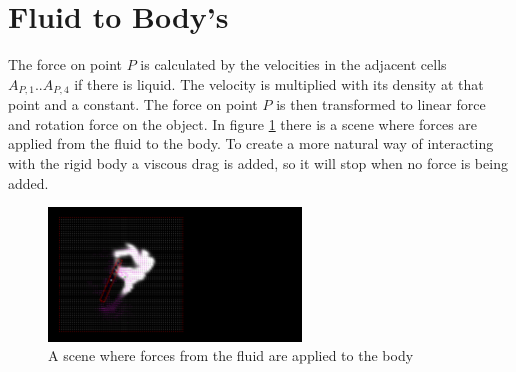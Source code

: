 \section{Fluid to Body's}
The force on point $P$ is calculated by the velocities in the adjacent cells $A_{P,1} .. A_{P,4}$ if there is liquid. The velocity is multiplied with its density at that point and a constant. The force on point $P$ is then transformed to linear force and rotation force on the object. In figure \ref{fig:FluidToBody} there is a scene where forces are applied from the fluid to the body. To create a more natural way of interacting with the rigid body a viscous drag is added, so it will stop when no force is being added.

\begin{figure}[htb!]
    \centering
    \includegraphics[width=0.6\textwidth]{images/FluidToBody}
    \caption{A scene where forces from the fluid are applied to the body}
    \label{fig:FluidToBody}
\end{figure}